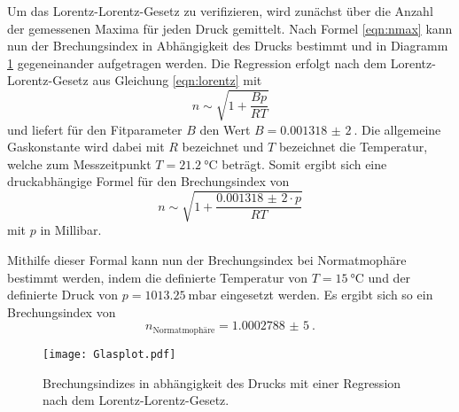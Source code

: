 

Um das Lorentz-Lorentz-Gesetz zu verifizieren, wird zunächst über die Anzahl der gemessenen Maxima für jeden
Druck gemittelt. Nach Formel \ref{eqn:nmax} kann nun der Brechungsindex in Abhängigkeit des Drucks bestimmt
und in Diagramm \ref{fig:Lorentz} gegeneinander aufgetragen werden.
Die Regression erfolgt nach dem Lorentz-Lorentz-Gesetz aus Gleichung \ref{eqn:lorentz} mit
\begin{equation}
  n\sim\sqrt{1+\frac{Bp}{RT}}
\end{equation}
und liefert für den Fitparameter $B$ den Wert $B=\SI{0,001318(2)}{}$. Die allgemeine Gaskonstante wird dabei mit $R$
bezeichnet und $T$ bezeichnet die Temperatur, welche zum Messzeitpunkt $T=\SI{21,2}{\celsius}$ beträgt.
Somit ergibt sich eine druckabhängige Formel für den Brechungsindex von
\begin{equation}
  n\sim\sqrt{1+\frac{\SI{0,001318(2)}\cdot p}{RT}}
\end{equation}
mit $p$ in Millibar.

Mithilfe dieser Formal kann nun der Brechungsindex bei Normatmophäre bestimmt werden, indem
die definierte Temperatur von $T=\SI{15}{\celsius}$ und der definierte Druck von $p=\SI{1013,25}{\milli\bar}$
eingesetzt werden. Es ergibt sich so ein Brechungsindex von
\begin{equation}
  n_\text{Normatmophäre}=\SI{1,0002788(5)}{}.
\end{equation}

\begin{figure}[H]
  \centering
  \texttt{[image: Glasplot.pdf]}
  \caption{Brechungsindizes in abhängigkeit des Drucks mit einer Regression nach dem Lorentz-Lorentz-Gesetz.}
  \label{fig:Lorentz}
\end{figure}



